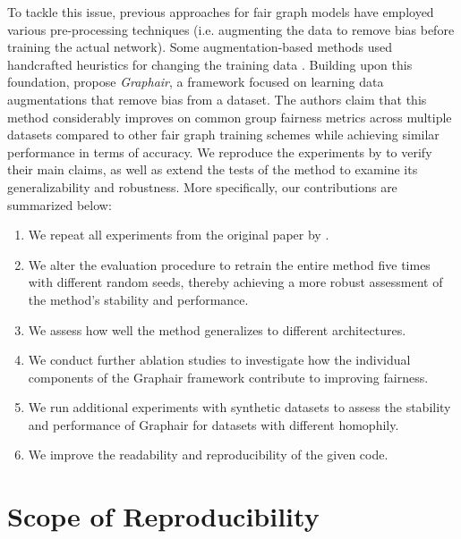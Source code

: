 To tackle this issue, previous approaches for fair graph models have employed various pre-processing techniques (i.e. augmenting the data to remove bias before training the actual network).
Some augmentation-based methods used handcrafted heuristics for changing the training data \citep{spinelli2021fairdrop, kose2022fair}. Building upon this foundation, \citet{ling2023learning} propose \textit{Graphair}, a framework focused on learning data augmentations that remove bias from a dataset. 
The authors claim that this method considerably improves on common group fairness metrics across multiple datasets compared to other fair graph training schemes while achieving similar performance in terms of accuracy. We reproduce the experiments by \citet{ling2023learning} to verify their main claims, as well as extend the tests of the method to examine its generalizability and robustness. More specifically, our contributions are summarized below:
\begin{enumerate}
    \item We repeat all experiments from the original paper by \citet{ling2023learning}.

    \item We alter the evaluation procedure to retrain the entire method five times with different random seeds, thereby achieving a more robust assessment of the method's stability and performance.
    
    \item We assess how well the method generalizes to different architectures.
    
    \item We conduct further ablation studies to investigate how the individual components of the Graphair framework contribute to improving fairness.
    
    \item We run additional experiments with synthetic datasets to assess the stability and performance of Graphair for datasets with different homophily. 
    
    \item We improve the readability and reproducibility of the given code.
\end{enumerate}

\section{Scope of Reproducibility}

